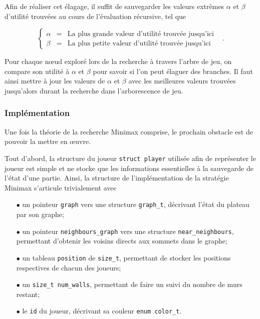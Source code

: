 \documentclass[11pt]{article}
\begin{document}
Afin de réaliser cet élagage, il suffit de sauvegarder les valeurs extrêmes $\alpha$ et $\beta$ d'utilité trouvées au cours de l'évaluation récursive, tel que

\begin{equation}
    \left\{\begin{matrix}
        \alpha & = & \text{La plus grande valeur d'utilit\'e trouv\'ee jusqu'ici}\\ 
        \beta & = & \text{La plus petite valeur d'utilit\'e trouv\'ee jusqu'ici}& 
    \end{matrix}\right..
\end{equation}

Pour chaque nœud exploré lors de la recherche à travers l’arbre de jeu, on compare son utilité à $\alpha$ et $\beta$ pour savoir si l’on peut élaguer des branches. Il faut ainsi mettre à jour les valeurs de $\alpha$ et $\beta$ avec les meilleures valeurs trouvées jusqu’alors durant la recherche dans l’arborescence de jeu.

\subsubsection{Implémentation}

Une fois la théorie de la recherche Minimax comprise, le prochain obstacle est de pouvoir la mettre en œuvre. 

Tout d'abord, la structure du joueur \texttt{struct player} utilisée afin de représenter le joueur est simple et ne stocke que les informations essentielles à la sauvegarde de l'état d'une partie. Ainsi, la structure de l'implémentation de la stratégie Minimax s'articule trivialement avec
\begin{itemize}
    \item [$\bullet$] un pointeur \texttt{graph} vers une structure \texttt{graph\_t}, décrivant l'état du plateau par son graphe;
    \item [$\bullet$] un pointeur \texttt{neighbours\_graph} vers une structure \texttt{near\_neighbours}, permettant d'obtenir les voisins directs aux sommets dans le graphe;
    \item [$\bullet$] un tableau \texttt{position} de \texttt{size\_t}, permettant de stocker les positions respectives de chacun des joueurs;
    \item [$\bullet$] un \texttt{size\_t num\_walls}, permettant de faire un suivi du nombre de murs restant;
    \item [$\bullet$] le \texttt{id} du joueur, décrivant sa couleur \texttt{enum color\_t}.
\end{itemize}
\end{document}
